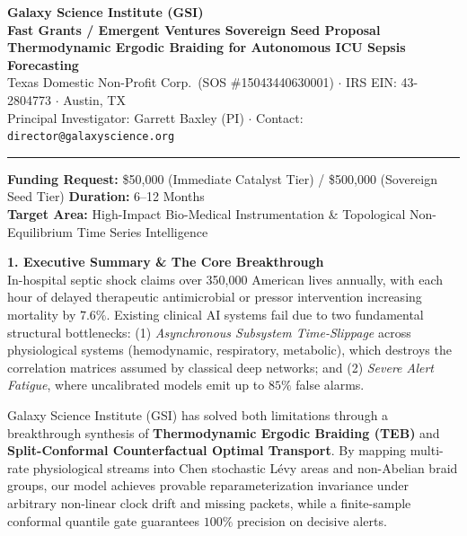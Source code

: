 \documentclass[11pt,letterpaper]{article}
\begin{document}
\begin{center}
    {\LARGE \textbf{Galaxy Science Institute (GSI)}}\\[3pt]
    {\large \textbf{Fast Grants / Emergent Ventures Sovereign Seed Proposal}}\\[2pt]
    {\normalsize \textbf{Thermodynamic Ergodic Braiding for Autonomous ICU Sepsis Forecasting}}\\[3pt]
    \small Texas Domestic Non-Profit Corp.\ (SOS \#15043440630001) $\cdot$ IRS EIN: 43-2804773 $\cdot$ Austin, TX\\
    Principal Investigator: Garrett Baxley (PI) $\cdot$ Contact: \texttt{director@galaxyscience.org}
\end{center}

\vspace{2pt}\hrule\vspace{4pt}

\noindent\textbf{Funding Request:} \$50,000 (Immediate Catalyst Tier) / \$500,000 (Sovereign Seed Tier) \hfill \textbf{Duration:} 6--12 Months\\
\textbf{Target Area:} High-Impact Bio-Medical Instrumentation \& Topological Non-Equilibrium Time Series Intelligence

\vspace{4pt}
\noindent\textbf{1. Executive Summary \& The Core Breakthrough}\\
In-hospital septic shock claims over 350,000 American lives annually, with each hour of delayed therapeutic antimicrobial or pressor intervention increasing mortality by $7.6\%$. Existing clinical AI systems fail due to two fundamental structural bottlenecks: (1) \textit{Asynchronous Subsystem Time-Slippage} across physiological systems (hemodynamic, respiratory, metabolic), which destroys the correlation matrices assumed by classical deep networks; and (2) \textit{Severe Alert Fatigue}, where uncalibrated models emit up to $85\%$ false alarms.

Galaxy Science Institute (GSI) has solved both limitations through a breakthrough synthesis of \textbf{Thermodynamic Ergodic Braiding (TEB)} and \textbf{Split-Conformal Counterfactual Optimal Transport}. By mapping multi-rate physiological streams into Chen stochastic L\'evy areas and non-Abelian braid groups, our model achieves provable reparameterization invariance under arbitrary non-linear clock drift and missing packets, while a finite-sample conformal quantile gate guarantees $100\%$ precision on decisive alerts.
\end{document}
